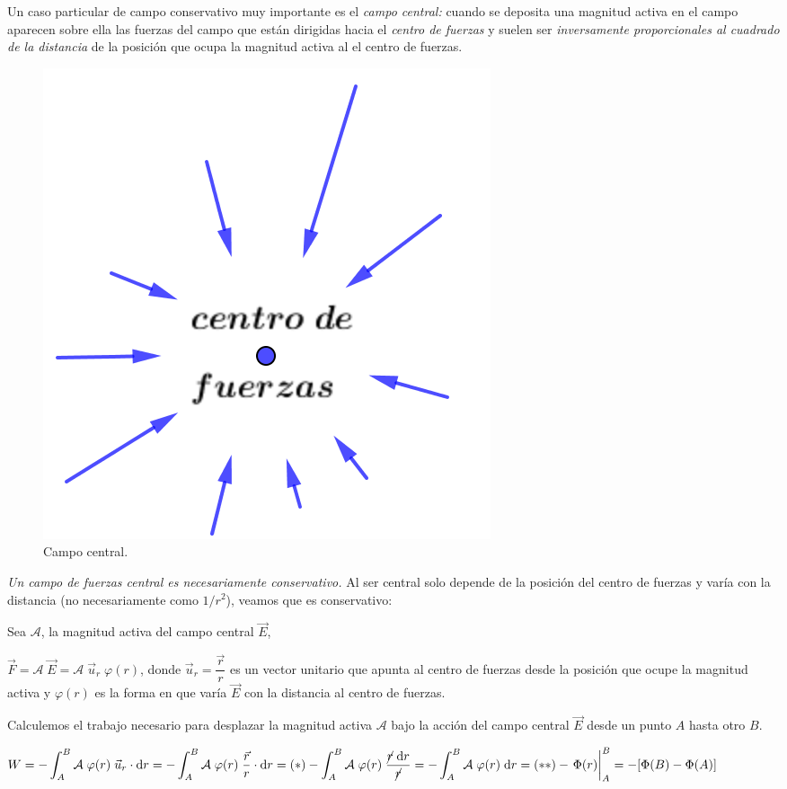 \begin{multicols}{2}
Un caso particular de campo conservativo muy importante es el \emph{campo central:} cuando se deposita una magnitud activa en el campo aparecen sobre ella las fuerzas del campo que están dirigidas hacia el \emph{centro de fuerzas} y suelen ser \emph{inversamente proporcionales al cuadrado de la distancia} de la posición que ocupa la magnitud activa al el centro de fuerzas.
\begin{figure}[H]
		\centering
		\includegraphics[width=.4\textwidth]{imagenes/imagenes03/T03IM10.png}
		\caption*{\footnotesize{Campo central}\normalsize{.}}
		\end{figure}
\end{multicols}

\emph{Un campo de fuerzas central es necesariamente conservativo.} Al ser central solo depende de la posición del centro de fuerzas y varía con la distancia (no necesariamente como $1/r^2$), veamos que es conservativo:

Sea $\mathcal A$, la magnitud activa del campo central $\vec E$,

$\Vec F=\mathcal A \; \vec E= \mathcal A \; \vec u_r \; \varphi(r)$, donde $\vec u_r=\dfrac {\vec r}{r}$ es un vector unitario que apunta al centro de fuerzas desde la posición que ocupe la magnitud activa y $\varphi(r)$ es la forma en que varía $\vec E$ con la distancia al centro de fuerzas.

 Calculemos el trabajo necesario para desplazar la magnitud activa $\mathcal A$ bajo la acción del campo central $\vec E$ desde un punto $A$ hasta otro $B$.
 
 $\displaystyle W=-\int_A^B \mathcal A\; \varphi(r) \;\vec u_r \cdot \dd r= -\int_A^B \mathcal A\; \varphi(r) \; \dfrac {\vec r}{r} \cdot \dd r =(*) -\int_A^B \mathcal A\; \varphi(r) \; \dfrac {\cancel{r}\;\dd r}{\cancel{r}}=-\int_A^B \mathcal A\; \varphi(r)\; \dd r=(**)-\eval{\Phi(r)}_{A}^B=-[\Phi(B)-\Phi(A)]$
 
